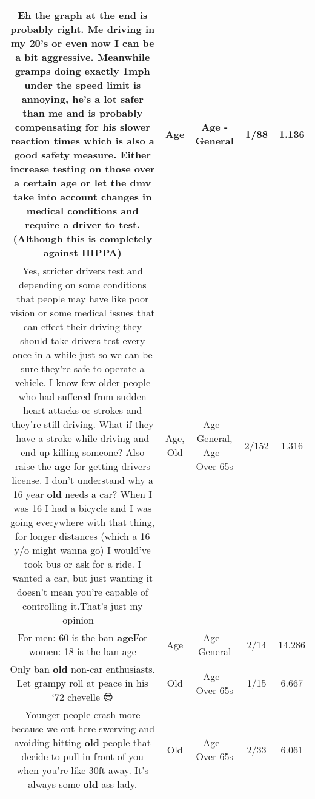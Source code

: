 \documentclass[11pt]{article}
\newlength\mylength
\begin{document}
\begin{center}
\begin{longtable}{|C{.65\mylength}|C{.30\mylength}|C{.12\mylength}|C{.12\mylength}|C{.12\mylength}|}
  \small Eh the graph at the end is probably right. Me driving in my 20's or even now I can be a bit aggressive. Meanwhile gramps doing exactly 1mph under the speed limit is annoying, he's a lot safer than me and is probably compensating for his slower reaction times which is also a good safety measure. Either increase testing on those over a certain \textbf{age} or let the dmv take into account changes in medical conditions and require a driver to test. (Although this is completely against HIPPA)\normalsize   & Age & Age - General & 1/88 & 1.136 \\  \hline
  \small Yes, stricter drivers test and depending on some conditions that people may have like poor vision or some medical issues that can effect their driving they should take drivers test every once in a while just so we can be sure they're safe to operate a vehicle. I know few older people who had suffered from sudden heart attacks or strokes and they're still driving. What if they have a stroke while driving and end up killing someone? Also raise the \textbf{age} for getting drivers license. I don't understand why a 16 year \textbf{old} needs a car? When I was 16 I had a bicycle and I was going everywhere with that thing, for longer distances (which a 16 y/o might wanna go) I would've took bus or ask for a ride. I wanted a car, but just wanting it doesn't mean you're capable of controlling it.That's just my opinion 🤷‍♂️\normalsize   & Age, Old & Age - General, Age - Over 65s & 2/152 & 1.316 \\  \hline
  \small For men: 60 is the ban \textbf{age}For women: 18 is the ban age\normalsize   & Age & Age - General & 2/14 & 14.286 \\  \hline
  \small Only ban \textbf{old} non-car enthusiasts. Let grampy roll at peace in his ‘72 chevelle 😎\normalsize   & Old & Age - Over 65s & 1/15 & 6.667 \\  \hline
  \small Younger people crash more because we out here swerving and avoiding hitting \textbf{old} people that decide to pull in front of you when you're like 30ft away. It's always some \textbf{old} ass lady.\normalsize   & Old & Age - Over 65s & 2/33 & 6.061 \\  \hline

\end{longtable}
\end{center}
\end{document}
